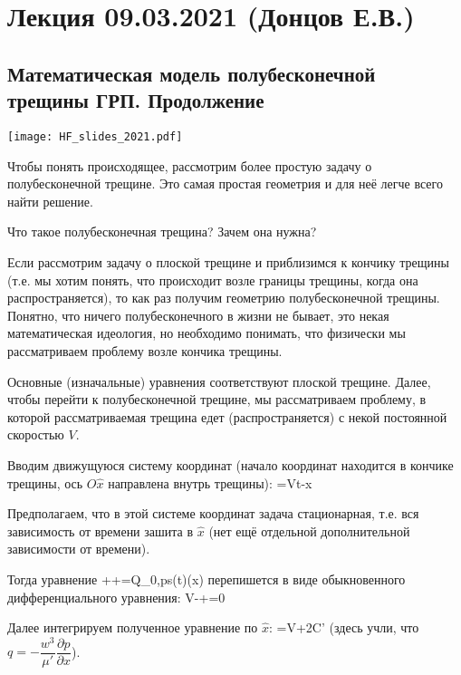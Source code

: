 \documentclass[main.tex]{subfiles}
\begin{document}

\section{Лекция 09.03.2021 (Донцов Е.В.)}

\subsection{Математическая модель полубесконечной трещины ГРП. Продолжение}

\texttt{[image: HF\_slides\_2021.pdf]}

Чтобы понять происходящее, рассмотрим более простую задачу о полубесконечной трещине.
Это самая простая геометрия и для неё легче всего найти решение.

Что такое полубесконечная трещина?
Зачем она нужна?

Если рассмотрим задачу о плоской трещине и приблизимся к кончику трещины (т.е. мы хотим понять, что происходит возле границы трещины, когда она распространяется), то как раз получим геометрию полубесконечной трещины.
Понятно, что ничего полубесконечного в жизни не бывает, это некая математическая идеология, но необходимо понимать, что физически мы рассматриваем проблему возле кончика трещины.

Основные (изначальные) уравнения соответствуют плоской трещине.
Далее, чтобы перейти к полубесконечной трещине, мы рассматриваем проблему, в которой рассматриваемая трещина едет (распространяется) с некой постоянной скоростью $V$.

Вводим движущуюся систему координат (начало координат находится в кончике трещины, ось $O\hat{x}$ направлена внутрь трещины):
\beq
{}=Vt-x
\eeq

Предполагаем, что в этой системе координат задача стационарная, т.е. вся зависимость от времени зашита в $\hat{x}$ (нет ещё отдельной дополнительной зависимости от времени).

Тогда уравнение
\beq
{}++=Q_{0,ps}(t)\delta(x)
\eeq
перепишется в виде обыкновенного дифференциального уравнения:
\beq
V-+=0
\eeq

Далее интегрируем полученное уравнение по $\hat{x}$:
\beq
{}=V+2C'
\eeq
(здесь учли, что $q=-\dfrac{w^3}{\mu'}\dfrac{\partial p}{\partial x}$).
\end{document}
